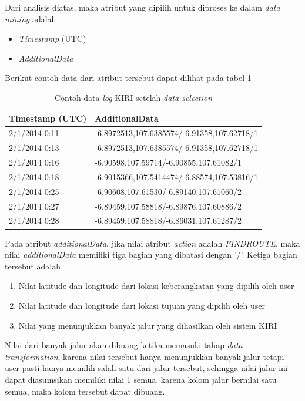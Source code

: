 Dari analisis diatas, maka atribut yang dipilih untuk diproses ke dalam \textsl{data mining} adalah
\begin{itemize}
	\item \textsl{Timestamp} (UTC)
	\item \textsl{AdditionalData}
\end{itemize}

Berikut contoh data dari atribut tersebut dapat dilihat pada tabel \ref{table:contohDataLog}
\begin{table}[h]
\caption{Contoh data \textsl{log} KIRI setelah \textsl{data selection}}
\label{table:contohDataLog}
\begin{tabular}{|l|l|}
\hline
\textbf{Timestamp (UTC)} & \textbf{AdditionalData}                     \\ \hline
2/1/2014 0:11            & -6.8972513,107.6385574/-6.91358,107.62718/1 \\ \hline
2/1/2014 0:13            & -6.8972513,107.6385574/-6.91358,107.62718/1 \\ \hline
2/1/2014 0:16            & -6.90598,107.59714/-6.90855,107.61082/1     \\ \hline
2/1/2014 0:18            & -6.9015366,107.5414474/-6.88574,107.53816/1 \\ \hline
2/1/2014 0:25            & -6.90608,107.61530/-6.89140,107.61060/2     \\ \hline
2/1/2014 0:27            & -6.89459,107.58818/-6.89876,107.60886/2     \\ \hline
2/1/2014 0:28            & -6.89459,107.58818/-6.86031,107.61287/2     \\ \hline
\end{tabular}
\end{table}

Pada atribut \textsl{additionalData}, jika nilai atribut \textsl{action} adalah \textsl{FINDROUTE}, maka nilai \textsl{additionalData} memiliki tiga bagian yang dibatasi dengan '/'. Ketiga bagian tersebut adalah

\begin{enumerate}
	\item Nilai latitude dan longitude dari lokasi keberangkatan yang dipilih oleh user
	\item Nilai latitude dan longitude dari lokasi tujuan yang dipilih oleh user
	\item Nilai yang menunjukkan banyak jalur yang dihasilkan oleh sistem KIRI
\end{enumerate}

Nilai dari banyak jalur akan dibuang ketika memasuki tahap \textsl{data transformation}, karena nilai tersebut hanya menunjukkan banyak jalur tetapi user pasti hanya memilih salah satu dari jalur tersebut, sehingga nilai jalur ini dapat diasumsikan memiliki nilai 1 semua. karena kolom jalur bernilai satu semua, maka kolom tersebut dapat dibuang.

